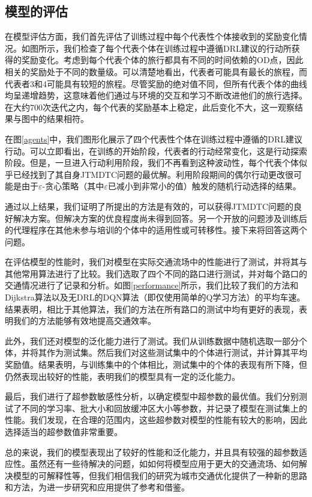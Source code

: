 \subsection{模型的评估}

在模型评估方面，我们首先评估了训练过程中每个代表性个体接收到的奖励变化情况。如图所示，我们检查了每个代表个体在训练过程中遵循DRL建议的行动所获得的奖励变化。考虑到每个代表个体的旅行都具有不同的时间依赖的OD点，因此相关的奖励处于不同的数量级。可以清楚地看出，代表者可能具有最长的旅程，而代表者3和4可能具有较短的旅程。尽管奖励的绝对值不同，但所有代表个体的曲线均呈递增趋势，这意味着他们通过与环境的交互和学习不断改进他们的旅行选择。在大约700次迭代之内，每个代表的奖励基本上稳定，此后变化不大，这一观察结果与图中的结果相符。

在图\ref{agents}中，我们图形化展示了四个代表性个体在训练过程中遵循的DRL建议行动。可以立即看出，在训练的开始阶段，代表者的行动经常变化，这是行动探索阶段。但是，一旦进入行动利用阶段，我们不再看到这种波动性，每个代表个体似乎已经找到了其自身JTMDTC问题的最优解。利用阶段期间的偶尔行动更改很可能是由于$\varepsilon$-贪心策略（其中$\varepsilon$已减小到非常小的值）触发的随机行动选择的结果。

通过以上结果，我们证明了所提出的方法是有效的，可以获得JTMDTC问题的良好解决方案。但解决方案的优良程度尚未得到回答。另一个开放的问题涉及训练后的代理程序在其他未参与培训的个体中的适用性或可转移性。接下来将回答这两个问题。

在评估模型的性能时，我们对模型在实际交通流场中的性能进行了测试，并将其与其他常用算法进行了比较。我们选取了四个不同的路口进行测试，并对每个路口的交通情况进行了记录和分析。如图\ref{performance}所示，我们比较了我们的方法和Dijkstra算法以及无DRL的DQN算法（即仅使用简单的Q学习方法）的平均车速。结果表明，相比于其他算法，我们的方法在所有路口的测试中均有更好的表现，表明我们的方法能够有效地提高交通效率。

此外，我们还对模型的泛化能力进行了测试。我们从训练数据中随机选取一部分个体，并将其作为测试集。然后我们对这些测试集中的个体进行测试，并计算其平均奖励值。结果表明，与训练集中的个体相比，测试集中的个体的表现有所下降，但仍然表现出较好的性能，表明我们的模型具有一定的泛化能力。

最后，我们进行了超参数敏感性分析，以确定模型中超参数的最优值。我们分别测试了不同的学习率、批大小和回放缓冲区大小等参数，并记录了模型在测试集上的性能。我们发现，在合理的范围内，这些超参数对模型的性能有较大的影响，因此选择适当的超参数值非常重要。

总的来说，我们的模型表现出了较好的性能和泛化能力，并且具有较强的超参数适应性。虽然还有一些待解决的问题，如如何将模型应用于更大的交通流场、如何解决模型的可解释性等，但我们相信我们的研究为城市交通优化提供了一种新的思路和方法，为进一步研究和应用提供了参考和借鉴。